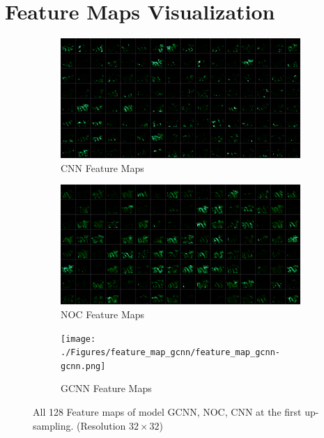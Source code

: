 \chapter{Feature Maps Visualization} %
\label{AppendixC} %

\newpage
\begin{figure}[H]
	\centering
	\captionsetup{width=\linewidth}
	\begin{subfigure}[b]{\linewidth}
		\includegraphics[width=\linewidth]{./Figures/feature_map_gcnn/feature_map_gcnn-cnn.png}
		\caption{CNN Feature Maps}
	\end{subfigure}
	
	\begin{subfigure}[b]{\linewidth}
		\includegraphics[width=\linewidth]{./Figures/feature_map_gcnn/feature_map_gcnn-noc.png}
		\caption{NOC Feature Maps}
	\end{subfigure}
	
	\begin{subfigure}[b]{\linewidth}
		\texttt{[image: ./Figures/feature\_map\_gcnn/feature\_map\_gcnn-gcnn.png]}
		\caption{GCNN Feature Maps}
	\end{subfigure}
	
	\decoRule
	\caption{All 128 Feature maps of model GCNN, NOC, CNN at the first up-sampling. (Resolution $ 32\times 32 $)}
	\label{fig:gcnn-cnn-feature map}
\end{figure}